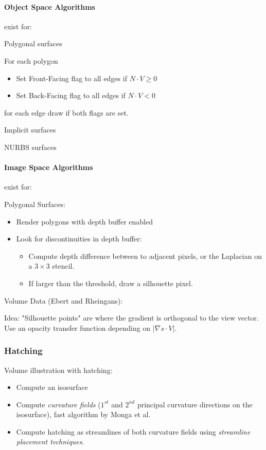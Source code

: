  \paragraph{Object Space Algorithms} exist for:
 \begin{description}
 \item Polygonal surfaces
 
     For each polygon
     \begin{itemize}
         \item Set Front-Facing flag to all edges if $N\cdot V \geq 0$
         \item Set Back-Facing flag to all edges if $N\cdot V<0$
     \end{itemize}
     for each edge draw if both flags are set.

 \item Implicit surfaces
 \item NURBS surfaces
 \end{description}
\paragraph{Image Space Algorithms} exist for:
\begin{description}
\item Polygonal Surfaces:
    \begin{itemize}
    \item Render polygons with depth buffer enabled
    \item Look for discontinuities in depth buffer:
        \begin{itemize}
            \item Compute depth difference between to adjacent pixels, or the Laplacian on a $3\times 3$ stencil.
            \item If larger than the threshold, draw a silhouette pixel.
        \end{itemize}
    \end{itemize}
\item Volume Data (Ebert and Rheingans):
    
    Idea: "Silhouette points" are where the gradient is orthogonal to the view vector. Use an opacity transfer function depending on $|\nabla s \cdot V|$.
\end{description}


\subsubsection{Hatching}
Volume illustration with hatching:
\begin{itemize}
\item Compute an isosurface
\item Compute \emph{curvature fields} ($1^{st}$ and $2^{nd}$ principal curvature directions on the isosurface), fast algorithm by Monga et al. 
\item Compute hatching as streamlines of both curvature fields using \emph{streamline placement techniques}.
\end{itemize}

